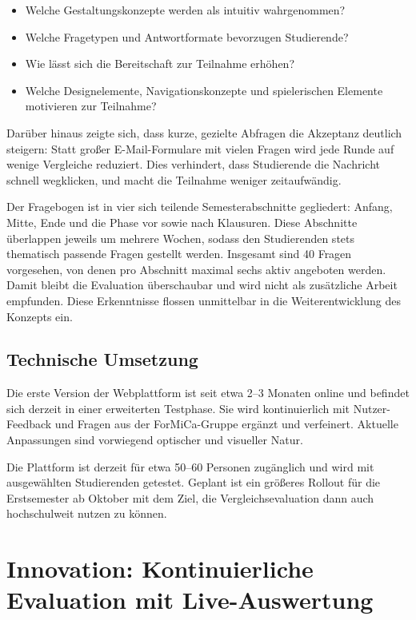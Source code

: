 \documentclass[12pt,a4paper,oneside]{article}
\begin{document}
\begin{itemize}
    \item Welche Gestaltungskonzepte werden als intuitiv wahrgenommen?
    \item Welche Fragetypen und Antwortformate bevorzugen Studierende?
    \item Wie lässt sich die Bereitschaft zur Teilnahme erhöhen?
    \item Welche Designelemente, Navigationskonzepte und spielerischen Elemente motivieren zur Teilnahme?
\end{itemize}
Darüber hinaus zeigte sich, dass kurze, gezielte Abfragen die Akzeptanz deutlich steigern: Statt großer E-Mail-Formulare mit vielen Fragen wird jede Runde auf wenige Vergleiche reduziert. Dies verhindert, dass Studierende die Nachricht schnell wegklicken, und macht die Teilnahme weniger zeitaufwändig.

Der Fragebogen ist in vier sich teilende Semesterabschnitte gegliedert: Anfang, Mitte, Ende und die Phase vor sowie nach Klausuren. Diese Abschnitte überlappen jeweils um mehrere Wochen, sodass den Studierenden stets thematisch passende Fragen gestellt werden. Insgesamt sind 40 Fragen vorgesehen, von denen pro Abschnitt maximal sechs aktiv angeboten werden. Damit bleibt die Evaluation überschaubar und wird nicht als zusätzliche Arbeit empfunden.
Diese Erkenntnisse flossen unmittelbar in die Weiterentwicklung des Konzepts ein.

\subsection{Technische Umsetzung}

Die erste Version der Webplattform ist seit etwa 2--3 Monaten online und befindet sich derzeit in einer erweiterten Testphase. Sie wird kontinuierlich mit Nutzer-Feedback und Fragen aus der ForMiCa-Gruppe ergänzt und verfeinert. Aktuelle Anpassungen sind vorwiegend optischer und visueller Natur.

Die Plattform ist derzeit für etwa 50--60 Personen zugänglich und wird mit ausgewählten Studierenden getestet. Geplant ist ein größeres Rollout für die Erstsemester ab Oktober mit dem Ziel, die Vergleichsevaluation dann auch hochschulweit nutzen zu können.

\section{Innovation: Kontinuierliche Evaluation mit Live-Auswertung}
\end{document}
